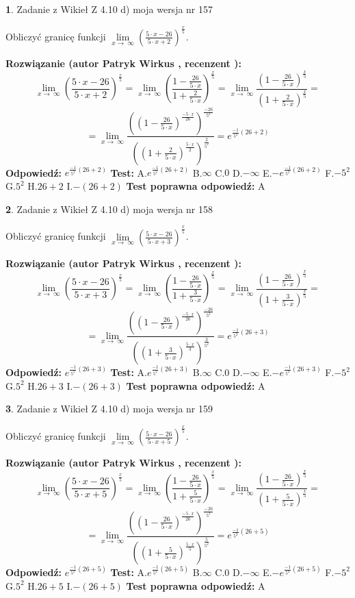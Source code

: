 \documentclass[12pt, a4paper]{article}
\theoremstyle{definition} %
\newtheorem{zad}{}
\newcommand{\zadStart}[1]{\begin{zad}#1\newline}
\newcommand{\zadStop}{\end{zad}}
\newcommand{\rozwStart}[2]{\noindent \textbf{Rozwiązanie (autor #1 , recenzent #2): }\newline}
\newcommand{\rozwStop}{\newline}
\newcommand{\odpStart}{\noindent \textbf{Odpowiedź:}\newline}
\newcommand{\odpStop}{\newline}
\newcommand{\testStart}{\noindent \textbf{Test:}\newline}
\newcommand{\testStop}{\newline}
\newcommand{\kluczStart}{\noindent \textbf{Test poprawna odpowiedź:}\newline}
\newcommand{\kluczStop}{\newline}
\begin{document}
\zadStart{Zadanie z Wikieł Z 4.10 d) moja wersja nr 157}


Obliczyć granicę funkcji  $\lim\limits_{x\to\ \infty}(\frac{5\cdot x-26}{5\cdot x+2})^{\frac{x}{5}}$.
\zadStop
\rozwStart{Patryk Wirkus}{}
$$\lim\limits_{x\to\ \infty}(\frac{5\cdot x-26}{5\cdot x+2})^{\frac{x}{5}} = \lim\limits_{x\to\ \infty}(\frac{1-\frac{26}{5\cdot x}}{1+\frac{2}{5\cdot x}})^{\frac{x}{5}}=\lim\limits_{x\to\ \infty}\frac{(1-\frac{26}{5\cdot x})^{\frac{x}{5}}}{(1+\frac{2}{5\cdot x})^{\frac{x}{5}}}=$$
$$=\lim\limits_{x\to\ \infty}\frac{((1-\frac{26}{5\cdot x})^{\frac{-5\cdot x}{26}})^{\frac{-26}{5^{2}}}}{((1+\frac{2}{5\cdot x})^{\frac{5\cdot x}{2}})^{\frac{2}{5^{2}}}}=e^{\frac{-1}{5^{2}}(26+2)}$$
\rozwStop
\odpStart
$e^{\frac{-1}{5^{2}}(26+2)}$
\odpStop
\testStart
A.$e^{\frac{-1}{5^{2}}(26+2)}$ B.$\infty$ C.$0$ D.$-\infty$ E.$-e^{\frac{-1}{5^{2}}(26+2)}$
F.$-5^{2}$ G.$5^{2}$
H.$26+2$
I.$-(26+2)$
\testStop
\kluczStart
A
\kluczStop



\zadStart{Zadanie z Wikieł Z 4.10 d) moja wersja nr 158}


Obliczyć granicę funkcji  $\lim\limits_{x\to\ \infty}(\frac{5\cdot x-26}{5\cdot x+3})^{\frac{x}{5}}$.
\zadStop
\rozwStart{Patryk Wirkus}{}
$$\lim\limits_{x\to\ \infty}(\frac{5\cdot x-26}{5\cdot x+3})^{\frac{x}{5}} = \lim\limits_{x\to\ \infty}(\frac{1-\frac{26}{5\cdot x}}{1+\frac{3}{5\cdot x}})^{\frac{x}{5}}=\lim\limits_{x\to\ \infty}\frac{(1-\frac{26}{5\cdot x})^{\frac{x}{5}}}{(1+\frac{3}{5\cdot x})^{\frac{x}{5}}}=$$
$$=\lim\limits_{x\to\ \infty}\frac{((1-\frac{26}{5\cdot x})^{\frac{-5\cdot x}{26}})^{\frac{-26}{5^{2}}}}{((1+\frac{3}{5\cdot x})^{\frac{5\cdot x}{3}})^{\frac{3}{5^{2}}}}=e^{\frac{-1}{5^{2}}(26+3)}$$
\rozwStop
\odpStart
$e^{\frac{-1}{5^{2}}(26+3)}$
\odpStop
\testStart
A.$e^{\frac{-1}{5^{2}}(26+3)}$ B.$\infty$ C.$0$ D.$-\infty$ E.$-e^{\frac{-1}{5^{2}}(26+3)}$
F.$-5^{2}$ G.$5^{2}$
H.$26+3$
I.$-(26+3)$
\testStop
\kluczStart
A
\kluczStop



\zadStart{Zadanie z Wikieł Z 4.10 d) moja wersja nr 159}


Obliczyć granicę funkcji  $\lim\limits_{x\to\ \infty}(\frac{5\cdot x-26}{5\cdot x+5})^{\frac{x}{5}}$.
\zadStop
\rozwStart{Patryk Wirkus}{}
$$\lim\limits_{x\to\ \infty}(\frac{5\cdot x-26}{5\cdot x+5})^{\frac{x}{5}} = \lim\limits_{x\to\ \infty}(\frac{1-\frac{26}{5\cdot x}}{1+\frac{5}{5\cdot x}})^{\frac{x}{5}}=\lim\limits_{x\to\ \infty}\frac{(1-\frac{26}{5\cdot x})^{\frac{x}{5}}}{(1+\frac{5}{5\cdot x})^{\frac{x}{5}}}=$$
$$=\lim\limits_{x\to\ \infty}\frac{((1-\frac{26}{5\cdot x})^{\frac{-5\cdot x}{26}})^{\frac{-26}{5^{2}}}}{((1+\frac{5}{5\cdot x})^{\frac{5\cdot x}{5}})^{\frac{5}{5^{2}}}}=e^{\frac{-1}{5^{2}}(26+5)}$$
\rozwStop
\odpStart
$e^{\frac{-1}{5^{2}}(26+5)}$
\odpStop
\testStart
A.$e^{\frac{-1}{5^{2}}(26+5)}$ B.$\infty$ C.$0$ D.$-\infty$ E.$-e^{\frac{-1}{5^{2}}(26+5)}$
F.$-5^{2}$ G.$5^{2}$
H.$26+5$
I.$-(26+5)$
\testStop
\kluczStart
A
\kluczStop
\end{document}
